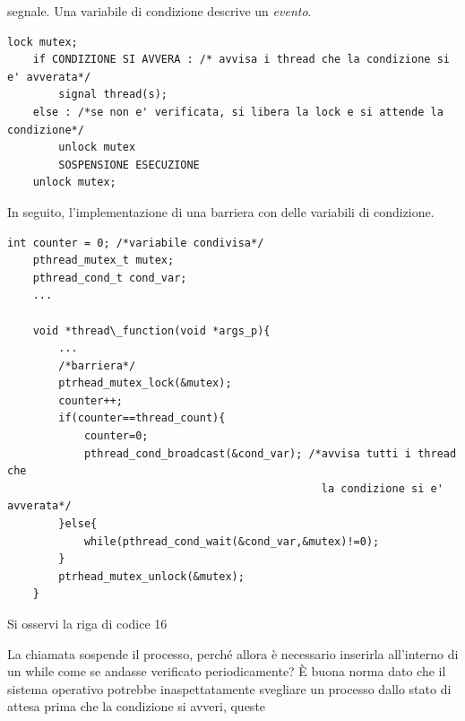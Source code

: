 \documentclass[10pt, letterpaper]{report}
\begin{document}
segnale. Una variabile di condizione descrive un \textit{evento}.
\begin{center}
    \begin{lstlisting}[style=CStyle]
    lock mutex;
    if CONDIZIONE SI AVVERA : /* avvisa i thread che la condizione si e' avverata*/
        signal thread(s); 
    else : /*se non e' verificata, si libera la lock e si attende la condizione*/
        unlock mutex
        SOSPENSIONE ESECUZIONE 
    unlock mutex;
    \end{lstlisting}
\end{center}
In seguito, l'implementazione di una barriera con delle variabili di condizione.
\begin{lstlisting}[style=CStyle]
    int counter = 0; /*variabile condivisa*/
    pthread_mutex_t mutex;
    pthread_cond_t cond_var;
    ... 

    void *thread\_function(void *args_p){
        ... 
        /*barriera*/
        ptrhead_mutex_lock(&mutex);
        counter++;
        if(counter==thread_count){
            counter=0;
            pthread_cond_broadcast(&cond_var); /*avvisa tutti i thread che 
                                                 la condizione si e' avverata*/
        }else{
            while(pthread_cond_wait(&cond_var,&mutex)!=0); 
        }
        ptrhead_mutex_unlock(&mutex);
    }
\end{lstlisting}
Si osservi la riga di codice 16\begin{quote}
\end{quote}
La chiamata  sospende il processo, perché allora è necessario inserirla 
all'interno di un while come se andasse verificato periodicamente? È buona norma dato che il sistema operativo 
potrebbe inaspettatamente svegliare un processo dallo stato di attesa prima che la condizione si avveri, queste 
\end{document}
